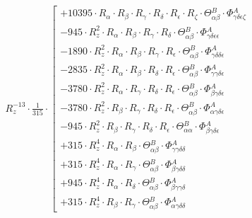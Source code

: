 \documentclass{article}
\begin{document}
\begin{subequations}
\begin{gather}
 R_{z}^{-13} \cdot \frac{1}{315} \cdot  \left[ \begin{array}{c} 
 		+ 10395 \cdot R_{\alpha{}} \cdot R_{\beta{}} \cdot R_{\gamma{}} \cdot R_{\delta{}} \cdot R_{\epsilon{}} \cdot R_{\zeta{}} \cdot \Theta{}^{B}_{\alpha{}\beta{}} \cdot \Phi{}^{A}_{\gamma{}\delta{}\epsilon{}\zeta{}} 
 \\[0.2em] 		 - 945 \cdot R_{z}^{2} \cdot R_{\alpha{}} \cdot R_{\beta{}} \cdot R_{\gamma{}} \cdot R_{\delta{}} \cdot \Theta{}^{B}_{\alpha{}\beta{}} \cdot \Phi{}^{A}_{\gamma{}\delta{}\epsilon{}\epsilon{}} 
 \\[0.2em] 		 - 1890 \cdot R_{z}^{2} \cdot R_{\alpha{}} \cdot R_{\beta{}} \cdot R_{\gamma{}} \cdot R_{\epsilon{}} \cdot \Theta{}^{B}_{\alpha{}\beta{}} \cdot \Phi{}^{A}_{\gamma{}\delta{}\delta{}\epsilon{}} 
 \\[0.2em] 		 - 2835 \cdot R_{z}^{2} \cdot R_{\alpha{}} \cdot R_{\beta{}} \cdot R_{\delta{}} \cdot R_{\epsilon{}} \cdot \Theta{}^{B}_{\alpha{}\beta{}} \cdot \Phi{}^{A}_{\gamma{}\gamma{}\delta{}\epsilon{}} 
 \\[0.2em] 		 - 3780 \cdot R_{z}^{2} \cdot R_{\alpha{}} \cdot R_{\gamma{}} \cdot R_{\delta{}} \cdot R_{\epsilon{}} \cdot \Theta{}^{B}_{\alpha{}\beta{}} \cdot \Phi{}^{A}_{\beta{}\gamma{}\delta{}\epsilon{}} 
 \\[0.2em] 		 - 3780 \cdot R_{z}^{2} \cdot R_{\beta{}} \cdot R_{\gamma{}} \cdot R_{\delta{}} \cdot R_{\epsilon{}} \cdot \Theta{}^{B}_{\alpha{}\beta{}} \cdot \Phi{}^{A}_{\alpha{}\gamma{}\delta{}\epsilon{}} 
 \\[0.2em] 		 - 945 \cdot R_{z}^{2} \cdot R_{\beta{}} \cdot R_{\gamma{}} \cdot R_{\delta{}} \cdot R_{\epsilon{}} \cdot \Theta{}^{B}_{\alpha{}\alpha{}} \cdot \Phi{}^{A}_{\beta{}\gamma{}\delta{}\epsilon{}} 
 \\[0.2em] 		 + 315 \cdot R_{z}^{4} \cdot R_{\alpha{}} \cdot R_{\beta{}} \cdot \Theta{}^{B}_{\alpha{}\beta{}} \cdot \Phi{}^{A}_{\gamma{}\gamma{}\delta{}\delta{}} 
 \\[0.2em] 		 + 315 \cdot R_{z}^{4} \cdot R_{\alpha{}} \cdot R_{\gamma{}} \cdot \Theta{}^{B}_{\alpha{}\beta{}} \cdot \Phi{}^{A}_{\beta{}\gamma{}\delta{}\delta{}} 
 \\[0.2em] 		 + 945 \cdot R_{z}^{4} \cdot R_{\alpha{}} \cdot R_{\delta{}} \cdot \Theta{}^{B}_{\alpha{}\beta{}} \cdot \Phi{}^{A}_{\beta{}\gamma{}\gamma{}\delta{}} 
 \\[0.2em] 		 + 315 \cdot R_{z}^{4} \cdot R_{\beta{}} \cdot R_{\gamma{}} \cdot \Theta{}^{B}_{\alpha{}\beta{}} \cdot \Phi{}^{A}_{\alpha{}\gamma{}\delta{}\delta{}} 

\end{array}
\end{gather}
\end{subequations}
\end{document}
